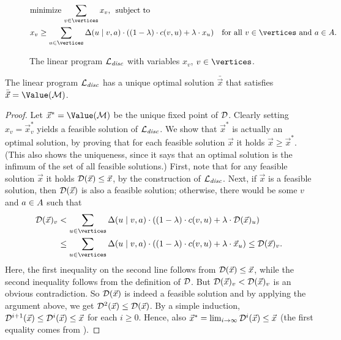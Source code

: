 \begin{figure}[h]
\begin{align*}
&\text{{minimize} $\sum_{v\in \vertices} x_v$, \textrm{ 
subject to }}&\\
&x_v \geq \sum_{u\in \vertices} \probTranFunc(u\mid 
v,a)\cdot\left((1-\lambda)\cdot \colouring(v,u) + \lambda\cdot x_u \right)
&
\text{for all $v\in \vertices$ and $a\in \actions$.}%
\end{align*}
\caption{The linear program $\mathcal{L}_{\mathit{disc}}$ with variables $x_v$, $v\in \vertices$.}
\label{5-fig:disc-lp}
\end{figure}

\begin{lemma}
\label{5-lem:disc-lp}
The linear program $\mathcal{L}_{\mathit{disc}}$ has a unique optimal solution 
$\bar{\vec{x}}$ that satisfies $\bar{\vec{x}} = \Value(\mdp)$.
\end{lemma}
\begin{proof}
Let $\vec{x}^* = \Value(\mdp)$ be the unique fixed point of $\mathcal{D}$. Clearly 
setting $x_v = \vec{x}^*_v$ yields a feasible solution of $\mathcal{L}_{\mathit{disc}}$. 
We show 
that $\vec{x}^*$ is actually an optimal solution, by proving that for each 
feasible solution $\vec{x}$ it holds $\vec{x} \geq \vec{x}^*$. (This also 
shows 
the uniqueness, since it says that an optimal solution is the infimum of the 
set of 
all feasible solutions.) First, note that for any feasible solution $\vec{x}$ 
it holds $\mathcal{D}(\vec{x})\leq \vec{x}$, by the construction of $\mathcal{L}_{\mathit{disc}}$. 
Next, if $\vec{x}$ is a feasible solution, then $\mathcal{D}(\vec{x})$ is also a 
feasible solution; otherwise, there would be some $v$ and $a\in A$ 
such that 
\begin{align*}\discOP(\vec{x})_v &< \sum_{u\in \vertices} \probTranFunc(u\mid 
v,a)\cdot\left((1-\lambda)\cdot \colouring(v,u) + \lambda\cdot 
\discOP(\vec{x})_u \right) \\ &\leq \sum_{u\in \vertices} \probTranFunc(u\mid 
v,a)\cdot\left((1-\lambda)\cdot \colouring(v,u) + \lambda\cdot \vec{x}_u 
\right) \leq \discOP(\vec{x})_v.
\end{align*}
Here, the first inequality on the second line follows from 
$\mathcal{D}(\vec{x})\leq \vec{x}$, while the second inequality follows from the 
definition of $\mathcal{D}$. But $\mathcal{D}(\vec{x})_v < \mathcal{D}(\vec{x})_v$ is an 
obvious contradiction. So $\mathcal{D}(\vec{x})$ is indeed a feasible solution and 
by applying the argument above, we get $\mathcal{D}^2(\vec{x}) \leq 
\mathcal{D}(\vec{x})$. By a simple induction, $\mathcal{D}^{i+1}(\vec{x})\leq 
\mathcal{D}^{i}(\vec{x})\leq \vec{x}$ for each $i\geq 0.$ Hence, also $\vec{x}^* = 
\lim_{i\rightarrow \infty} \mathcal{D}^i(\vec{x}) \leq \vec{x}$ (the first equality 
comes from ).
\end{proof}

